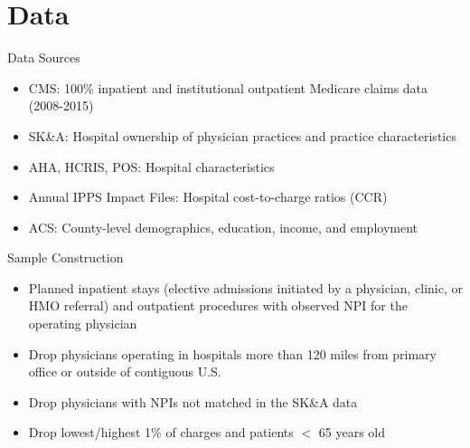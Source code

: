 \documentclass[t,aspectratio=169]{beamer}
\begin{document}
\section{Data}
\begin{frame}{Data Sources}
    \begin{itemize}
        \item<1-> CMS: 100\% inpatient and institutional outpatient Medicare claims data (2008-2015)
        \item<1-> SK\&A: Hospital ownership of physician practices and practice characteristics
        \item<2-> AHA, HCRIS, POS: Hospital characteristics
        \item<2-> Annual IPPS Impact Files: Hospital cost-to-charge ratios (CCR)
        \item<2-> ACS: County-level demographics, education, income, and employment
    \end{itemize}
\end{frame}

\begin{frame}{Sample Construction}
    \begin{itemize}
        \item<1-> Planned inpatient stays (elective admissions initiated by a physician, clinic, or HMO referral) and outpatient procedures with observed NPI for the operating physician
        \item<2-> Drop physicians operating in hospitals more than 120 miles from primary office or outside of contiguous U.S.
        \item<2-> Drop physicians with NPIs not matched in the SK\&A data
        \item<2-> Drop lowest/highest 1\% of charges and patients $<$ 65 years old
    \end{itemize}
\end{frame}
\end{document}

